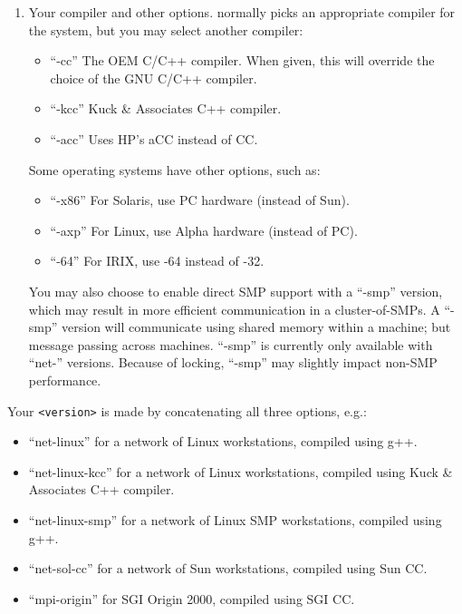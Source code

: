 \documentclass[10pt]{article}
\begin{document}
\begin{enumerate}
\item Your compiler and other options.  \ampi{} normally picks an
appropriate compiler for the system, but you may select another
compiler:

\begin{itemize}
\item ``-cc''      The OEM C/C++ compiler.  When given, this
will override the choice of the GNU C/C++ compiler.
\item ``-kcc''     Kuck \& Associates C++ compiler.
\item ``-acc''     Uses HP's aCC instead of CC.
\end{itemize}

Some operating systems have other options, such as:

\begin{itemize}
\item ``-x86''     For Solaris, use PC hardware (instead of Sun).
\item ``-axp''     For Linux, use Alpha hardware (instead of PC).
\item ``-64''      For IRIX, use -64 instead of -32. 
\end{itemize}

You may also choose to enable direct SMP support with a ``-smp''
version, which may result in more efficient communication in
a cluster-of-SMPs.  A ``-smp'' version will communicate using
shared memory within a machine; but message passing across machines.
``-smp'' is currently only available with ``net-'' versions.
Because of locking, ``-smp'' may slightly impact non-SMP performance.

\end{enumerate}

Your \ampi{} \verb+<version>+ is made by concatenating all three options, e.g.:

\begin{itemize}
\item ``net-linux''     \ampi{} for a network of Linux workstations, compiled
using g++.
\item ``net-linux-kcc'' \ampi{} for a network of Linux workstations, compiled
using Kuck \& Associates C++ compiler.
\item ``net-linux-smp'' \ampi{} for a network of Linux SMP workstations,
compiled using g++.
\item ``net-sol-cc''    \ampi{} for a network of Sun workstations, 
compiled using Sun CC.
\item ``mpi-origin''    \ampi{} for SGI Origin 2000, compiled using SGI CC.
\end{itemize}
\end{document}
